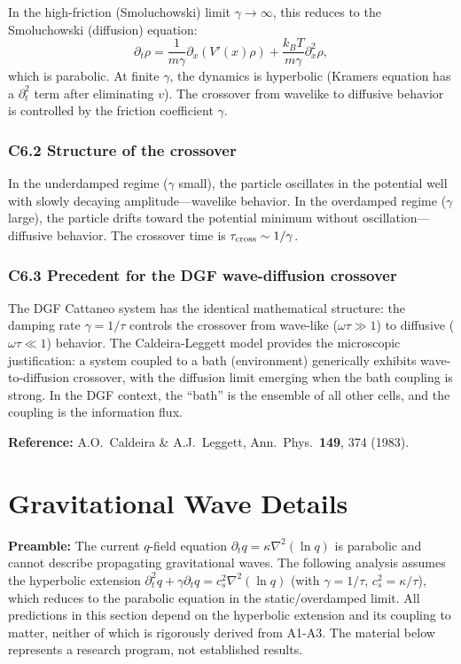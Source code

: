 \documentclass[reprint]{revtex4-2}
\begin{document}
In the high-friction (Smoluchowski) limit $\gamma \to \infty$, this reduces to the Smoluchowski (diffusion) equation:
\begin{equation}
\partial_t\rho = \frac{1}{m\gamma}\partial_x(V'(x)\rho) + \frac{k_B T}{m\gamma}\partial_x^2\rho,
\end{equation}
which is parabolic. At finite $\gamma$, the dynamics is hyperbolic (Kramers equation has a $\partial_t^2$ term after eliminating $v$). The crossover from wavelike to diffusive behavior is controlled by the friction coefficient $\gamma$.

\subsubsection{C6.2 Structure of the crossover}

In the underdamped regime ($\gamma$ small), the particle oscillates in the potential well with slowly decaying amplitude---wavelike behavior. In the overdamped regime ($\gamma$ large), the particle drifts toward the potential minimum without oscillation---diffusive behavior. The crossover time is $\tau_{\rm cross} \sim 1/\gamma$.

\subsubsection{C6.3 Precedent for the DGF wave-diffusion crossover}

The DGF Cattaneo system has the identical mathematical structure: the damping rate $\gamma = 1/\tau$ controls the crossover from wave-like ($\omega\tau \gg 1$) to diffusive ($\omega\tau \ll 1$) behavior. The Caldeira-Leggett model provides the microscopic justification: a system coupled to a bath (environment) generically exhibits wave-to-diffusion crossover, with the diffusion limit emerging when the bath coupling is strong. In the DGF context, the ``bath'' is the ensemble of all other cells, and the coupling is the information flux.

\textbf{Reference:} A.O.\ Caldeira \& A.J.\ Leggett, Ann.\ Phys.\ \textbf{149}, 374 (1983).

\section{Gravitational Wave Details}

\textbf{Preamble:} The current $q$-field equation $\partial_t q = \kappa\nabla^2(\ln q)$ is parabolic and cannot describe propagating gravitational waves. The following analysis assumes the hyperbolic extension $\partial_t^2 q + \gamma\partial_t q = c_s^2\nabla^2(\ln q)$ (with $\gamma = 1/\tau$, $c_s^2 = \kappa/\tau$), which reduces to the parabolic equation in the static/overdamped limit. All predictions in this section depend on the hyperbolic extension and its coupling to matter, neither of which is rigorously derived from A1-A3. The material below represents a research program, not established results.
\end{document}
